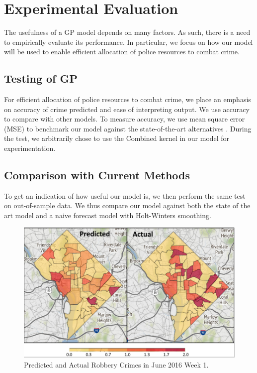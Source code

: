 \documentclass[letterpaper]{article}
\begin{document}
	\section{Experimental Evaluation}
	The usefulness of a GP model depends on many factors. As such, there is a need to empirically evaluate its performance.
	In particular, we focus on how our model will be used to enable efficient allocation of police resources to combat crime.

	\subsection{Testing of GP}
	For efficient allocation of police resources to combat crime, we place an emphasis on accuracy of crime predicted and ease of interpreting output. 
	We use accuracy to compare with other models. To measure accuracy, we use mean square error (MSE) to benchmark our model against the state-of-the-art alternatives \autocite{6}. During the test, we arbitrarily chose to use the Combined kernel in our model for experimentation.

	\subsection{Comparison with Current Methods}
	
	To get an indication of how useful our model is, we then perform the same test on out-of-sample data.
	We thus compare our model against both the state of the art model and a naive forecast model with Holt-Winters smoothing.
	
	\begin{figure}[!ht]
		\includegraphics[width=\linewidth]{./p2.png}
		\caption{Predicted and Actual Robbery Crimes in June 2016 Week 1.}
		\label{p2}
	\end{figure}
\end{document}
